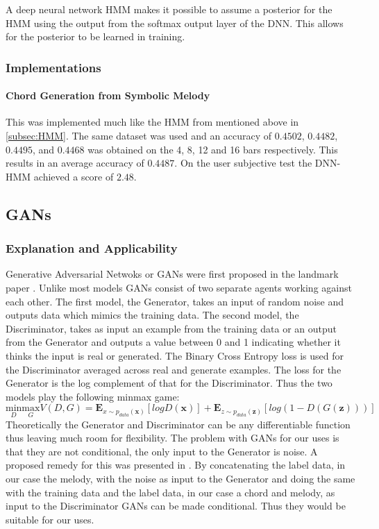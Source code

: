 A deep neural network HMM makes it possible to assume a posterior for the HMM using the output from the softmax output layer of the DNN. 
This allows for the posterior to be learned in training.

\subsubsection{Implementations}

\paragraph{Chord Generation from Symbolic Melody} This was implemented much like the HMM from \cite{BLSTM} mentioned above in \ref{subsec:HMM}.
The same dataset was used and an accuracy of $0.4502$, $0.4482$, $0.4495$, and $0.4468$  was obtained on the 4, 8, 12 and 16 bars respectively. This results in an average accuracy of $0.4487$.
On the user subjective test the DNN-HMM achieved a score of $2.48$.

\subsection{GANs}

\subsubsection{Explanation and Applicability}

Generative Adversarial Netwoks or GANs were first proposed in the landmark paper \cite{GANs}. Unlike most models GANs consist of two separate agents working against each other.
The first model, the Generator, takes an input of random noise and outputs data which mimics the training data. 
The second model, the Discriminator, takes as input an example from the training data or an output from the Generator and outputs a value between 0 and 1 indicating whether it thinks the input is real or generated.
The Binary Cross Entropy loss is used for the Discriminator averaged across real and generate examples. The loss for the Generator is the log complement of that for the Discriminator. Thus the two models play the following minmax game:
\begin{equation}
\underset{D}{\text{min}} \underset{G}{\text{max}} V(D,G) = \mathbf{E}_{x\sim p_{data}(\mathbf{x})}[logD(\mathbf{x})] + \mathbf{E}_{z\sim p_{data}(\mathbf{z})}[log(1-D(G(\mathbf{z})))]
\end{equation} 
Theoretically the Generator and Discriminator can be any differentiable function thus leaving much room for flexibility.
The problem with GANs for our uses is that they are not conditional, the only input to the Generator is noise. A proposed remedy for this was presented in \cite{CGANs}.
By concatenating the label data, in our case the melody, with the noise as input to the Generator and doing the same with the training data and the label data, in our case a chord and melody, as input to the Discriminator GANs can be made conditional. 
Thus they would be suitable for our uses. 

